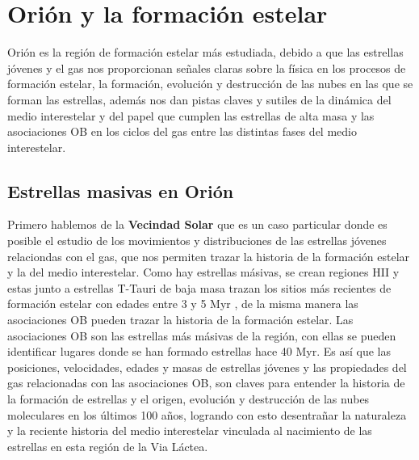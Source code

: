 % 


% 

\label{chap:introduction}

\section{ Orión y la formación estelar}
\label{sec:formation} 


Orión es la región de formación estelar más estudiada, debido a que las estrellas jóvenes y el gas nos proporcionan señales claras sobre la física en los procesos de formación estelar, la formación, evolución  y destrucción de las nubes en las que se forman las estrellas, además nos dan pistas claves y sutiles de la dinámica del medio interestelar y del papel que cumplen las estrellas de alta masa y las asociaciones OB en los ciclos del gas entre las distintas fases del medio interestelar.\\

\subsection{Estrellas masivas en Orión}
\label{sec:star}

Primero hablemos de la \textbf{Vecindad Solar} que es un caso particular donde es posible el estudio de los movimientos y distribuciones de las estrellas jóvenes relaciondas con el gas, que nos permiten trazar la historia de la formación estelar y la del medio interestelar. Como hay estrellas másivas, se crean regiones HII y estas junto a estrellas T-Tauri de baja masa trazan los sitios más recientes de formación estelar con edades entre 3 y 5 Myr \citep{Bally:2008a}, de la misma manera las asociaciones OB pueden trazar la historia de la formación estelar. Las asociaciones OB son las estrellas más másivas de la región, con ellas se pueden identificar lugares donde se han formado estrellas hace 40 Myr. Es así que las posiciones, velocidades, edades y masas de estrellas jóvenes y las propiedades del gas relacionadas con las asociaciones OB, son claves para entender la historia de la formación de estrellas y el origen, evolución y destrucción de las nubes moleculares en los últimos 100 años, logrando con esto desentrañar la naturaleza y la reciente historia del medio interestelar vinculada al nacimiento de las estrellas en esta región de la Via Láctea.\\

